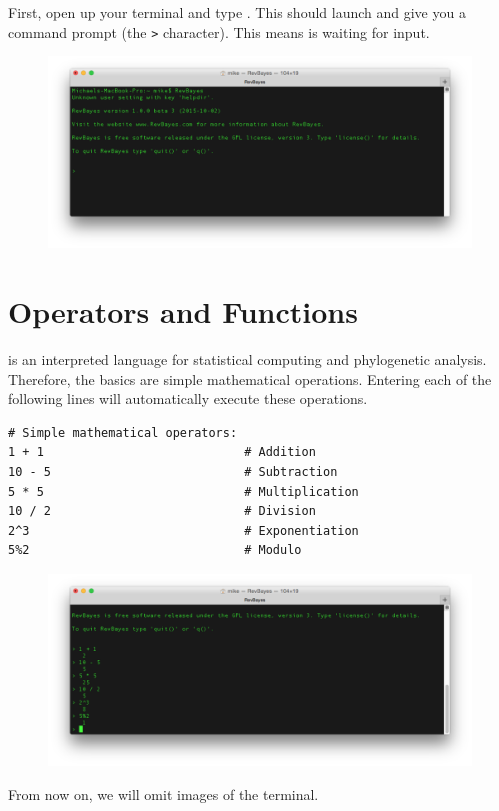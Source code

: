 First, open up your terminal and type \RevBayes.
This should launch \RevBayes and give you a command prompt (the \texttt{>} character).
This means \RevBayes is waiting for input.
\begin{figure}[H]
	\centering
	\includegraphics[width=\linewidth]{figures/terminal.pdf}
\end{figure}

\section*{Operators and Functions}

\Rev is an interpreted language for statistical computing and phylogenetic analysis.
Therefore, the basics are simple mathematical operations.
Entering each of the following lines will automatically execute these operations.
{\tt \begin{snugshade*}
\begin{lstlisting}    
# Simple mathematical operators:
1 + 1                            # Addition
10 - 5                           # Subtraction
5 * 5                            # Multiplication
10 / 2                           # Division
2^3                              # Exponentiation
5%2                              # Modulo
\end{lstlisting}
\end{snugshade*}}

\begin{figure}[H]
	\centering
	\includegraphics[width=\linewidth]{figures/revbayes_operations.pdf}
\end{figure}
\noindent From now on, we will omit images of the terminal.

